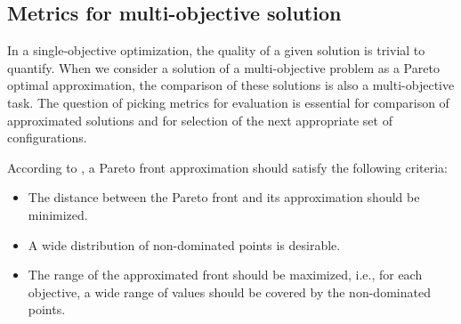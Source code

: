 
        \subsection{Metrics for multi-objective solution}
            In a single-objective optimization, the quality of a given solution is trivial to quantify. When we consider a solution of a multi-objective problem as a Pareto optimal approximation, the comparison of these solutions is also a multi-objective task.
            The question of picking metrics for evaluation is essential for comparison of approximated solutions and for selection of the next appropriate set of configurations.

            According to \cite{ZitzlerDT00}, a Pareto front approximation should satisfy the following criteria:
            \begin{itemize}
                \item The distance between the Pareto front and its approximation should be minimized.
                \item A wide distribution of non-dominated points is desirable.
                \item The range of the approximated front should be maximized, i.e., for each objective, a wide range of values should be covered by the non-dominated points.
            \end{itemize}

